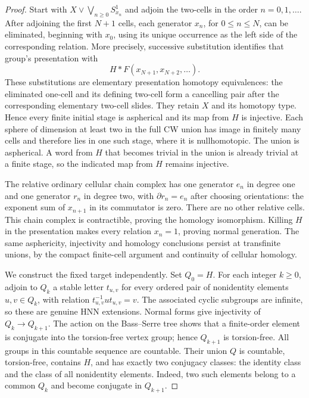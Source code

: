 \begin{proof}
Start with $X\vee\bigvee_{n\geq0}S^1_{x_n}$ and adjoin the two-cells
in the order $n=0,1,\ldots$. After adjoining the first $N+1$ cells,
each generator $x_n$, for $0\leq n\leq N$, can be eliminated, beginning
with $x_0$, using its unique occurrence as the left side of the
corresponding relation. More precisely, successive substitution
identifies that group's presentation with
\[
 H*F(x_{N+1},x_{N+2},\ldots).
\]
These substitutions are elementary presentation homotopy equivalences:
the eliminated one-cell and its defining two-cell form a cancelling
pair after the corresponding elementary two-cell slides. They retain
$X$ and its homotopy type. Hence every finite initial stage is
aspherical and its map from $H$ is injective. Each sphere of dimension at least two in the full
CW union has image in finitely many cells and therefore lies in one
such stage, where it is nullhomotopic. The union is aspherical. A word
from $H$ that becomes trivial in the union is already trivial at a
finite stage, so the indicated map from $H$ remains injective.

The relative ordinary cellular chain complex has one generator $e_n$
in degree one and one generator $r_n$ in degree two, with
$\partial r_n=e_n$ after choosing orientations: the exponent sum of
$x_{n+1}$ in its commutator is zero. There are no other relative
cells. This chain complex is contractible, proving the homology
isomorphism. Killing $H$ in the presentation makes every relation
$x_n=1$, proving normal generation. The same asphericity,
injectivity and homology conclusions persist at transfinite unions,
by the compact finite-cell argument and continuity of cellular
homology.

We construct the fixed target independently. Set $Q_0=H$. For each
integer $k\geq0$, adjoin to $Q_k$ a stable letter $t_{u,v}$ for every
ordered pair of nonidentity elements $u,v\in Q_k$, with relation
$t_{u,v}^{-1}ut_{u,v}=v$. The associated cyclic subgroups are infinite,
so these are genuine HNN extensions. Normal forms give injectivity
of $Q_k\to Q_{k+1}$. The action on the Bass--Serre tree shows that a
finite-order element is conjugate into the torsion-free vertex group;
hence $Q_{k+1}$ is torsion-free. All groups in this countable sequence
are countable. Their union $Q$ is countable, torsion-free, contains
$H$, and has exactly two conjugacy classes: the identity class and
the class of all nonidentity elements. Indeed, two such elements
belong to a common $Q_k$ and become conjugate in $Q_{k+1}$.


\end{proof}
